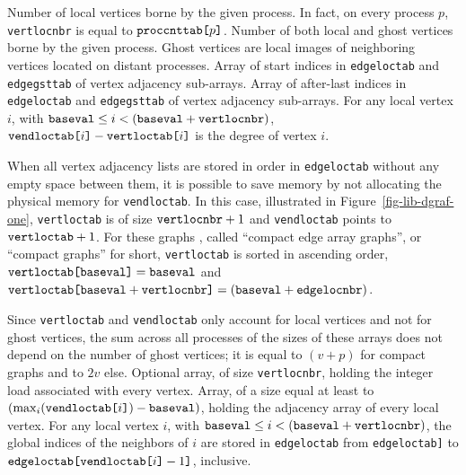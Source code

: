 \begin{itemize}
\iteme[{\tt vertlocnbr}]
Number of local vertices borne by the given process. In
fact, on every process $p$, {\tt vert\lbt loc\lbt nbr} is equal to
${\tt proc\lbt cnt\lbt tab}\mbox{\tt [}p\mbox{\tt]}$.
\iteme[{\tt vertgstnbr}]
Number of both local and ghost vertices borne by the given process.
Ghost vertices are local images of neighboring vertices located on
distant processes.
\iteme[{\tt vertloctab}]
Array of start indices in {\tt edgeloctab} and {\tt edgegsttab} of
vertex adjacency sub-arrays.
\iteme[{\tt vendloctab}]
Array of after-last indices in {\tt edgeloctab} and {\tt edgegsttab}
of vertex adjacency sub-arrays.
For any local vertex $i$, with $\mbox{\tt baseval} \leq i < (\mbox{\tt
baseval} + \mbox{\tt vertlocnbr})$,
$\mbox{\tt vend\lbt loc\lbt tab[}i\mbox{\tt ]} -
\mbox{\tt vert\lbt loc\lbt tab[}i\mbox{\tt ]}$
is the degree of vertex $i$.

When all vertex adjacency lists are stored in order in
{\tt edge\lbt loc\lbt tab} without any empty space between them,
it is possible to save memory by not allocating the physical memory
for {\tt vend\lbt loc\lbt tab}. In this case, illustrated in
Figure~\ref{fig-lib-dgraf-one}, {\tt vert\lbt loc\lbt tab} is of size
$\mbox{\tt vert\lbt loc\lbt nbr} + 1$ and {\tt vend\lbt loc\lbt tab}
points to $\mbox{\tt vert\lbt loc\lbt tab} + 1$.
For these graphs , called ``compact edge array graphs'', or ``compact
graphs'' for short, {\tt vert\lbt loc\lbt tab} is sorted in
ascending order, $\mbox{\tt vert\lbt loc\lbt tab[}\lbt\mbox{\tt
baseval]} = \mbox{\tt baseval}$ and $\mbox{\tt vert\lbt loc\lbt
tab[}\lbt\mbox{\tt baseval} + \mbox{\tt vert\lbt loc\lbt nbr]} =
(\mbox{\tt baseval} + \mbox{\tt edge\lbt loc\lbt nbr})$.

Since {\tt vertloctab} and {\tt vendloctab} only account for local
vertices and not for ghost vertices, the sum across all processes of the
sizes of these arrays does not depend on the number of ghost vertices;
it is equal to $(v+p)$ for compact graphs and to $2v$ else.
\iteme[{\tt veloloctab}]
Optional array, of size {\tt vert\lbt loc\lbt nbr}, holding the
integer load associated with every vertex.
\iteme[{\tt edgeloctab}]
Array, of a size equal at least to $\left(\max_{i}(\mbox{\tt vend\lbt
loc\lbt tab[} i \mbox{\tt ]}) - \mbox{\tt baseval}\right)$, holding
the adjacency array of every local vertex.
For any local vertex $i$, with $\mbox{\tt baseval} \leq i < (\mbox{\tt
baseval} + \mbox{\tt vertlocnbr})$, the global indices of the neighbors
of $i$ are stored in {\tt edge\lbt loc\lbt tab}
from {\tt edge\lbt loc\lbt tab\lbt [vert\lbt loc\lbt tab[$i$]]} to
$\mbox{\tt edge\lbt loc\lbt tab[vend\lbt loc\lbt tab[}i\mbox{\tt ]} -
1\mbox{\tt ]}$, inclusive.


\end{itemize}

